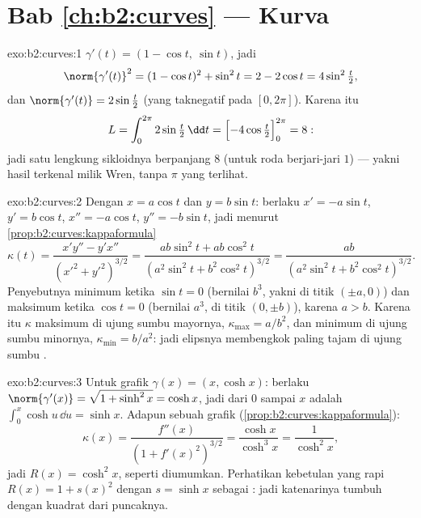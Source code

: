 \section*{Bab \ref{ch:b2:curves} --- Kurva}

\begin{solution}{exo:b2:curves:1}
$\gamma'(t) = (1 - \cos t,\ \sin t)$, jadi
\[
\norm{\gamma'(t)}^2 = (1 - \cos t)^2 + \sin^2 t
= 2 - 2\cos t = 4\sin^2\tfrac t2 ,
\]
dan $\norm{\gamma'(t)} = 2\sin\frac t2$ (yang taknegatif pada $[0,
2\pi]$). Karena itu
\[
L = \int_0^{2\pi} 2\sin\tfrac t2\,\dd t
= \Bigl[-4\cos\tfrac t2\Bigr]_0^{2\pi} = 8 :
\]
jadi satu lengkung sikloidnya berpanjang $8$ (untuk roda berjari-jari
$1$) --- yakni hasil terkenal milik Wren, tanpa $\pi$ yang terlihat.
\end{solution}

\begin{solution}{exo:b2:curves:2}
Dengan $x = a\cos t$ dan $y = b\sin t$: berlaku $x' = -a\sin t$, $y' = b\cos
t$, $x'' = -a\cos t$, $y'' = -b\sin t$, jadi menurut
\cref{prop:b2:curves:kappaformula}
\[
\kappa(t)
= \frac{x'y'' - y'x''}{(x'^2 + y'^2)^{3/2}}
= \frac{ab\sin^2 t + ab\cos^2 t}
       {(a^2\sin^2 t + b^2\cos^2 t)^{3/2}}
= \frac{ab}{(a^2\sin^2 t + b^2\cos^2 t)^{3/2}} .
\]
Penyebutnya minimum ketika $\sin t = 0$ (bernilai $b^3$, yakni di titik
$(\pm a, 0)$) dan maksimum ketika $\cos t = 0$ (bernilai $a^3$, di titik
$(0, \pm b)$), karena $a > b$. Karena itu $\kappa$ maksimum di
ujung sumbu mayornya, $\kappa_{\max} = a/b^2$, dan minimum di
ujung sumbu minornya, $\kappa_{\min} = b/a^2$: jadi elipsnya
membengkok paling tajam di ujung sumbu .
\end{solution}

\begin{solution}{exo:b2:curves:3}
Untuk grafik $\gamma(x) = (x, \cosh x)$: berlaku $\norm{\gamma'(x)} =
\sqrt{1 + \sinh^2 x} = \cosh x$, jadi  dari $0$ sampai $x$
adalah $\int_0^x \cosh u\,\dd u = \sinh x$. Adapun  sebuah grafik
(\cref{prop:b2:curves:kappaformula}):
\[
\kappa(x) = \frac{f''(x)}{(1 + f'(x)^2)^{3/2}}
= \frac{\cosh x}{\cosh^3 x} = \frac{1}{\cosh^2 x} ,
\]
jadi $R(x) = \cosh^2 x$, seperti diumumkan. Perhatikan kebetulan yang rapi
$R(x) = 1 + s(x)^2$ dengan $s = \sinh x$ sebagai : jadi
 katenarinya tumbuh dengan kuadrat  dari puncaknya.
\end{solution}

